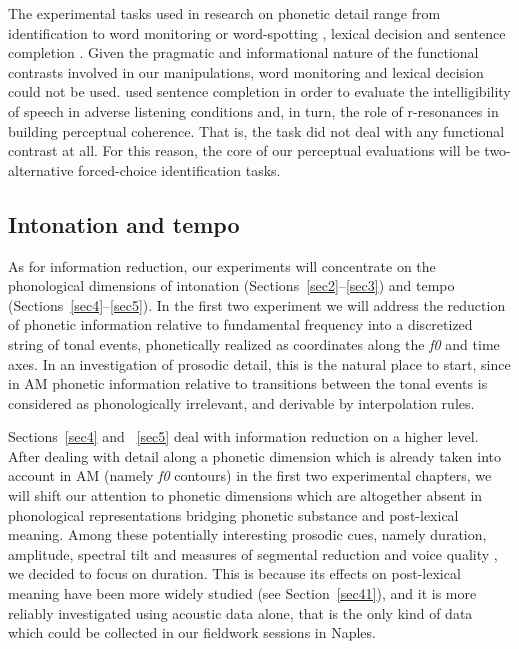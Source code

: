 The experimental tasks used in research on phonetic detail range from identification \citep{west1999perception} to word monitoring or word-spotting \citep{smith2000allophonic}, lexical decision \citep{hawkins2003effects} and sentence completion \citep{heinrich2010influence}. Given the pragmatic and informational nature of the functional contrasts involved in our manipulations, word monitoring and lexical decision could not be used. \citet{heinrich2010influence} used sentence completion in order to evaluate the intelligibility of speech in adverse listening conditions and, in turn, the role of r-resonances in building perceptual coherence. That is, the task did not deal with any functional contrast at all. For this reason, the core of our perceptual evaluations will be two-alternative forced-choice identification tasks.

\subsection{Intonation and tempo}\label{sec132}
As for information reduction, our experiments will concentrate on the phonological dimensions of intonation (Sections~\ref{sec2}--\ref{sec3}) and tempo (Sections~\ref{sec4}--\ref{sec5}). In the first two experiment we will address the reduction of phonetic information relative to fundamental frequency into a discretized string of tonal events, phonetically realized as coordinates along the \textit{f0} and time axes. In an investigation of prosodic detail, this is the natural place to start, since in AM phonetic information relative to transitions between the tonal events is considered as phonologically irrelevant, and derivable by interpolation rules. 

Sections~\ref{sec4} and ~\ref{sec5} deal with information reduction on a higher level. After dealing with detail along a phonetic dimension which is already taken into account in AM (namely \textit{f0} contours) in the first two experimental chapters, we will shift our attention to phonetic dimensions which are altogether absent in phonological representations bridging phonetic substance and post-lexical meaning. Among these potentially interesting prosodic cues, namely duration, amplitude, \citep{shattuck1996prosody} spectral tilt and measures of segmental reduction \citep{ladd2008intonational} and voice quality \citep{campbell2003voice}, we decided to focus on duration. This is because its effects on post-lexical meaning have been more widely studied (see Section~\ref{sec41}), and it is more reliably investigated using acoustic data alone, that is the only kind of data which could be collected in our fieldwork sessions in Naples.

